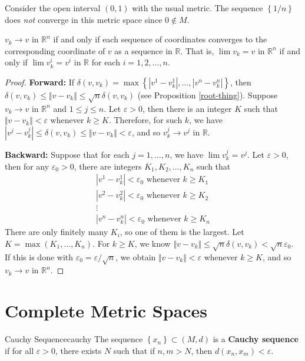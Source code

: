 \documentclass[10pt]{report}
\begin{document}
\begin{ex}{}{}
	Consider the open interval $(0,1)$ with the usual metric. The sequence $\left\{ 1/n \right\}$ does \textit{not} converge in this metric space since $0 \not\in M$.
\end{ex}

\begin{prop}
	$v_k \to v$ in $\mathbb{R}^n$ if and only if each sequence of coordinates converges to the corresponding coordinate of $v$ as a sequence in $\mathbb{R}$. That is, $\lim v_k = v$ in $\mathbb{R}^n$ if and only if $\lim v_k^i = v^i$ in $\mathbb{R}$ for each $i=1,2,\dots,n$.
\end{prop}
\begin{proof}
	\textbf{Forward:} If $\delta(v,v_k) = \max\left\{ |v^1-v_k^1|, \dots, |v^n-v_k^n| \right\}$, then $\delta(v,v_k) \leq \Vert{v-v_k}\Vert \leq \sqrt{n} \delta(v,v_k)$ (see Proposition \ref{root-thing}). Suppose $v_k \to v$ in $\mathbb{R}^n$ and $1 \leq j \leq n$. Let $\varepsilon>0$, then there is an integer $K$ such that $\Vert{v-v_k}\Vert<\varepsilon$ whenever $k \geq K$. Therefore, for such $k$, we have $|v^j - v_k^j| \leq \delta(v,v_k) \leq \Vert{v-v_k}\Vert<\varepsilon$, and so $v_k^j \to v^j$ in $\mathbb{R}$.

	\textbf{Backward:} Suppose that for each $j=1,\dots,n$, we have $\lim v_k^j = v^j$. Let $\varepsilon>0$, then for any $\varepsilon_0>0$, there are integers $K_1,K_2,\dots,K_n$ such that
	\begin{gather*}
		|v^1 - v_k^1| < \varepsilon_0 \text{ whenever } k \geq K_1 \\
		|v^2 - v_k^2| < \varepsilon_0 \text{ whenever } k \geq K_2 \\
			      \vdots \\
		|v^n - v_k^n| < \varepsilon_0 \text{ whenever } k \geq K_n
	\end{gather*}
	There are only finitely many $K_i$, so one of them is the largest. Let $K= \max(K_1,\dots,K_n)$. For $k \geq K$, we know $\Vert{v-v_k}\Vert \leq \sqrt{n} \delta(v,v_k) < \sqrt{n} \varepsilon_0$. If this is done with $\varepsilon_0=\varepsilon/\sqrt{n} $, we obtain $\Vert{v-v_k}\Vert<\varepsilon$ whenever $k \geq K$, and so $v_k \to v$ in $\mathbb{R}^n$.
\end{proof}



\section{Complete Metric Spaces}
\begin{defn}{Cauchy Sequence}{cauchy}
	The sequence $\left\{ x_n \right\}\subset (M,d)$ is a \textbf{Cauchy sequence} if for all $\varepsilon>0$, there exists $N$ such that if $n,m>N$, then $d(x_n,x_m) < \varepsilon$.
\end{defn}
\end{document}
